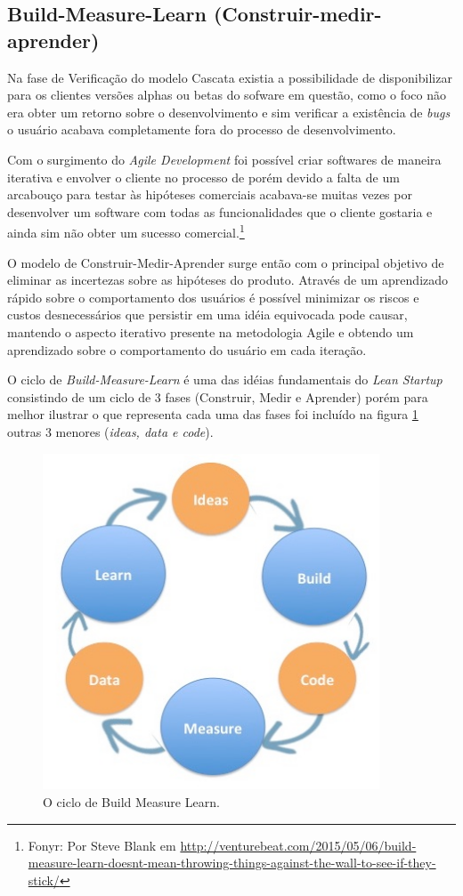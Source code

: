 \subsection{Build-Measure-Learn (Construir-medir-aprender)}
\par Na fase de Verificação do modelo Cascata existia a possibilidade de disponibilizar para os clientes versões alphas ou betas do sofware em questão, como o foco não era obter um retorno sobre o desenvolvimento e sim verificar a existência de \emph{bugs} o usuário acabava completamente fora do processo de desenvolvimento.
\par Com o surgimento do \emph{Agile Development} foi possível criar softwares de maneira iterativa e envolver o cliente no processo de  porém devido a falta de um arcabouço para testar às hipóteses comerciais acabava-se muitas vezes por  desenvolver um software com todas as funcionalidades que o cliente gostaria e ainda sim não obter um sucesso comercial.\footnote{Fonyr: Por Steve Blank em \url{http://venturebeat.com/2015/05/06/build-measure-learn-doesnt-mean-throwing-things-against-the-wall-to-see-if-they-stick/}}
\par O modelo de Construir-Medir-Aprender surge então com o principal objetivo de eliminar as incertezas sobre as hipóteses do produto.  Através de um aprendizado rápido sobre o comportamento dos usuários é possível  minimizar os riscos  e custos desnecessários que persistir em uma idéia equivocada pode causar, mantendo o aspecto iterativo presente na metodologia Agile e obtendo um aprendizado sobre o comportamento do usuário em cada iteração.
\par O ciclo de \emph{Build-Measure-Learn} é uma das idéias fundamentais do \emph{Lean Startup} consistindo de um ciclo de 3 fases (Construir, Medir e Aprender) porém para melhor ilustrar o que representa cada uma das fases foi incluído na figura \ref{fig:buildmeasurelearn} outras 3 menores (\emph{ideas, data e code}).
\begin{figure}[htb]
\centering
\includegraphics[width=10cm]{figuras/buildmeasurelearn}
\caption{\label{fig:buildmeasurelearn}O ciclo de Build Measure Learn.}
\end{figure}
